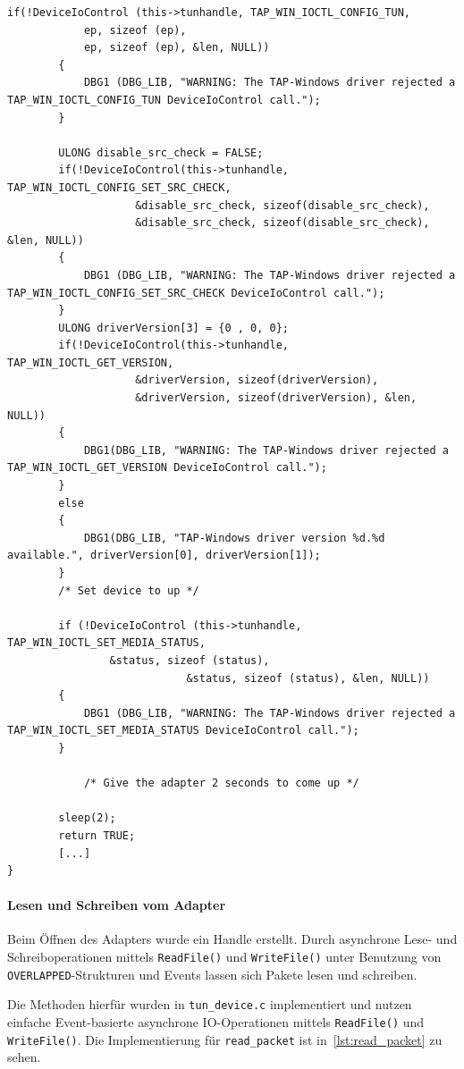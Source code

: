 {\begin{lstlisting}[caption=Konfiguration eines TAP-Geräts,label=lst:tap-device-configuration]
        if(!DeviceIoControl (this->tunhandle, TAP_WIN_IOCTL_CONFIG_TUN,
            ep, sizeof (ep),
            ep, sizeof (ep), &len, NULL))
        {
            DBG1 (DBG_LIB, "WARNING: The TAP-Windows driver rejected a TAP_WIN_IOCTL_CONFIG_TUN DeviceIoControl call.");
        }

        ULONG disable_src_check = FALSE;
        if(!DeviceIoControl(this->tunhandle, TAP_WIN_IOCTL_CONFIG_SET_SRC_CHECK,
                    &disable_src_check, sizeof(disable_src_check),
                    &disable_src_check, sizeof(disable_src_check), &len, NULL))
        {
            DBG1 (DBG_LIB, "WARNING: The TAP-Windows driver rejected a TAP_WIN_IOCTL_CONFIG_SET_SRC_CHECK DeviceIoControl call.");
        }
        ULONG driverVersion[3] = {0 , 0, 0};
        if(!DeviceIoControl(this->tunhandle, TAP_WIN_IOCTL_GET_VERSION,
                    &driverVersion, sizeof(driverVersion),
                    &driverVersion, sizeof(driverVersion), &len, NULL))
        {
            DBG1(DBG_LIB, "WARNING: The TAP-Windows driver rejected a TAP_WIN_IOCTL_GET_VERSION DeviceIoControl call.");
        }
        else
        {
            DBG1(DBG_LIB, "TAP-Windows driver version %d.%d available.", driverVersion[0], driverVersion[1]);
        }
        /* Set device to up */

        if (!DeviceIoControl (this->tunhandle, TAP_WIN_IOCTL_SET_MEDIA_STATUS,
                &status, sizeof (status),
                            &status, sizeof (status), &len, NULL))
        {
            DBG1 (DBG_LIB, "WARNING: The TAP-Windows driver rejected a TAP_WIN_IOCTL_SET_MEDIA_STATUS DeviceIoControl call.");
        }

            /* Give the adapter 2 seconds to come up */

        sleep(2);
        return TRUE;
        [...]
}
\end{lstlisting}


\paragraph{Lesen und Schreiben vom Adapter}
Beim Öffnen des Adapters wurde ein Handle erstellt.
Durch asynchrone Lese- und Schreiboperationen mittels \texttt{ReadFile()} und \texttt{WriteFile()}
unter Benutzung von \texttt{OVERLAPPED}-Strukturen und Events lassen sich Pakete
lesen und schreiben.

Die Methoden hierfür wurden in \texttt{tun\_device.c} implementiert
und nutzen einfache Event-basierte asynchrone IO-Operationen mittels \texttt{ReadFile()}
und \texttt{WriteFile()}.
Die Implementierung für \texttt{read\_packet} ist in~\autoref{lst:read_packet} zu sehen.

}
